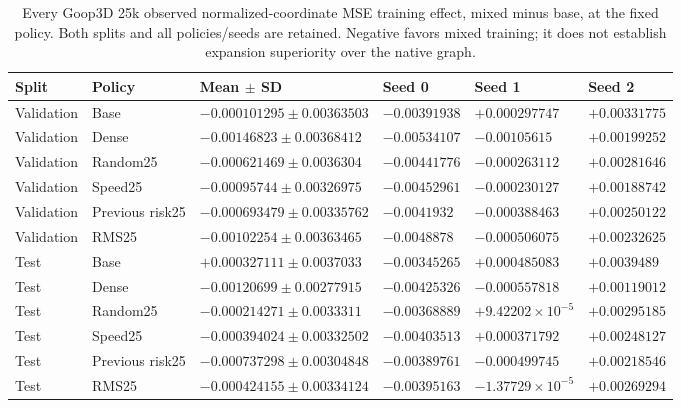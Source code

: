 \begin{table}[p]
\centering\scriptsize
\caption{Every Goop3D 25k observed normalized-coordinate MSE training effect, mixed minus base, at the fixed policy. Both splits and all policies/seeds are retained. Negative favors mixed training; it does not establish expansion superiority over the native graph.}
\label{tab:goop3d25k-observed-normalized-training}
\setlength{\tabcolsep}{3pt}
\begin{tabular}{llllll}
\toprule
Split & Policy & Mean $\pm$ SD & Seed 0 & Seed 1 & Seed 2\\
\midrule
Validation & Base & $-0.000101295\pm0.00363503$ & $-0.00391938$ & $+0.000297747$ & $+0.00331775$\\
Validation & Dense & $-0.00146823\pm0.00368412$ & $-0.00534107$ & $-0.00105615$ & $+0.00199252$\\
Validation & Random25 & $-0.000621469\pm0.0036304$ & $-0.00441776$ & $-0.000263112$ & $+0.00281646$\\
Validation & Speed25 & $-0.00095744\pm0.00326975$ & $-0.00452961$ & $-0.000230127$ & $+0.00188742$\\
Validation & Previous risk25 & $-0.000693479\pm0.00335762$ & $-0.0041932$ & $-0.000388463$ & $+0.00250122$\\
Validation & RMS25 & $-0.00102254\pm0.00363465$ & $-0.0048878$ & $-0.000506075$ & $+0.00232625$\\
Test & Base & $+0.000327111\pm0.0037033$ & $-0.00345265$ & $+0.000485083$ & $+0.0039489$\\
Test & Dense & $-0.00120699\pm0.00277915$ & $-0.00425326$ & $-0.000557818$ & $+0.00119012$\\
Test & Random25 & $-0.000214271\pm0.0033311$ & $-0.00368889$ & $+9.42202\!\times\!10^{-5}$ & $+0.00295185$\\
Test & Speed25 & $-0.000394024\pm0.00332502$ & $-0.00403513$ & $+0.000371792$ & $+0.00248127$\\
Test & Previous risk25 & $-0.000737298\pm0.00304848$ & $-0.00389761$ & $-0.000499745$ & $+0.00218546$\\
Test & RMS25 & $-0.000424155\pm0.00334124$ & $-0.00395163$ & $-1.37729\!\times\!10^{-5}$ & $+0.00269294$\\
\bottomrule
\end{tabular}
\end{table}
